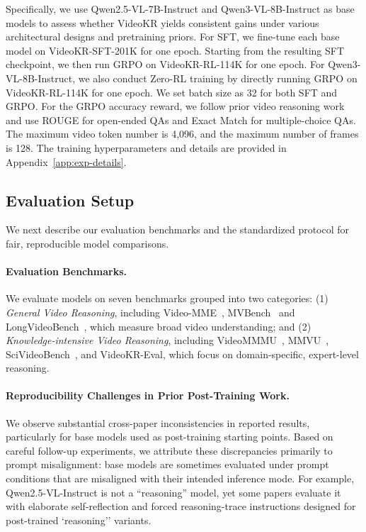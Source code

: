 \documentclass{llmxive}
\providecommand{\data}{VideoKR\xspace}
\providecommand{\eval}{VideoKR-Eval\xspace}
\providecommand{\sftdata}{VideoKR-SFT-201K\xspace}
\providecommand{\rldata}{VideoKR-RL-114K\xspace}
\begin{document}
Specifically, we use Qwen2.5-VL-7B-Instruct and Qwen3-VL-8B-Instruct as base models to assess whether \data yields consistent gains under various architectural designs and pretraining priors.
For SFT, we fine-tune each base model on \sftdata for one epoch. Starting from the resulting SFT checkpoint, we then run GRPO on \rldata for one epoch. 
For Qwen3-VL-8B-Instruct, we also conduct Zero-RL training by directly running GRPO on \rldata for one epoch.
We set batch size as 32 for both SFT and GRPO. 
For the GRPO accuracy reward, we follow prior video reasoning work~\cite{videor1, videorft} and use ROUGE for open-ended QAs and Exact Match for multiple-choice QAs.
The maximum video token number is 4,096, and the maximum number of frames is 128. The training hyperparameters and details are provided in Appendix~\ref{app:exp-details}.







\subsection{Evaluation Setup}\label{sec:reproduce-analysis}
We next describe our evaluation benchmarks and the standardized protocol for fair, reproducible model comparisons.

\vspace{-8pt}
\paragraph{Evaluation Benchmarks.}
We evaluate models on seven benchmarks
grouped into two categories: 
(1) \emph{General Video Reasoning}, including Video-MME~\cite{videmme}, MVBench~\cite{mvbench} and LongVideoBench~\cite{wu2024longvideobench}, which measure broad video understanding; and (2) \emph{Knowledge-intensive Video Reasoning}, including VideoMMMU~\cite{videommmu}, MMVU~\cite{mmvu},  SciVideoBench~\cite{scivideobench}, and \eval, which focus on domain-specific, expert-level reasoning. 

\vspace{-8pt}
\paragraph{Reproducibility Challenges in Prior Post-Training Work.}
We observe substantial cross-paper inconsistencies in reported results, particularly for base models used as post-training starting points. Based on careful follow-up experiments, we attribute these discrepancies primarily to prompt misalignment: base models are sometimes evaluated under prompt conditions that are misaligned with their intended inference mode. For example, Qwen2.5-VL-Instruct is not a ``reasoning'' model, yet some papers evaluate it with elaborate self-reflection and forced reasoning-trace instructions designed for post-trained `reasoning'' variants.
\end{document}
